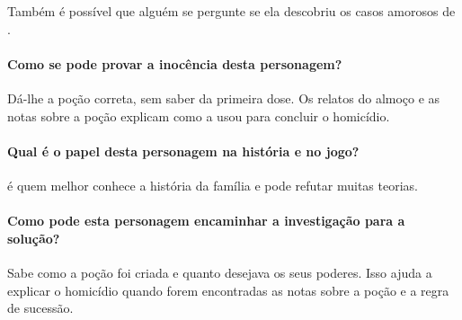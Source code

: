 {{Também é possível que alguém se pergunte se ela descobriu os casos amorosos de .

\paragraph{Como se pode provar a inocência desta personagem?}
Dá-lhe a poção correta, sem saber da primeira dose. Os relatos do almoço e as notas sobre a poção explicam como  a usou para concluir o homicídio.

\paragraph{Qual é o papel desta personagem na história e no jogo?}
 é quem melhor conhece a história da família e pode refutar muitas teorias.

\paragraph{Como pode esta personagem encaminhar a investigação para a solução?}
Sabe como a poção foi criada e quanto  desejava os seus poderes. Isso ajuda a explicar o homicídio quando forem encontradas as notas sobre a poção e a regra de sucessão.
}
}
